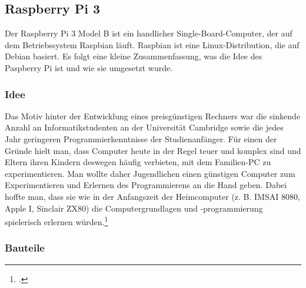 \subsection{Raspberry Pi 3}

Der Raspberry Pi 3 Model B ist ein handlicher Single-Board-Computer, der auf dem Betriebssystem Raspbian läuft. Raspbian ist eine Linux-Distribution, die auf Debian basiert. Es folgt eine kleine Zusammenfassung, was die Idee des Paspberry Pi ist und wie sie umgesetzt wurde.

\subsubsection{Idee}
Das Motiv hinter der Entwicklung eines preisgünstigen Rechners war die sinkende Anzahl an Informatikstudenten an der Universität Cambridge sowie die jedes Jahr geringeren Programmierkenntnisse der Studienanfänger. Für einen der Gründe hielt man, dass Computer heute in der Regel teuer und komplex sind und Eltern ihren Kindern deswegen häufig verbieten, mit dem Familien-PC zu experimentieren. Man wollte daher Jugendlichen einen günstigen Computer zum Experimentieren und Erlernen des Programmierens an die Hand geben. Dabei hoffte man, dass sie wie in der Anfangszeit der Heimcomputer (z. B. IMSAI 8080, Apple I, Sinclair ZX80) die Computergrundlagen und -programmierung spielerisch erlernen würden.\footcite{shit_raspi}

\subsubsection{Bauteile}
\setcounter{secnumdepth}{4}
